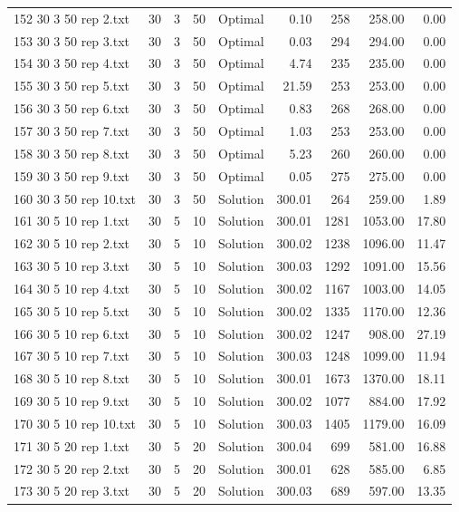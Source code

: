 \begin{longtable}{lrrllrrrr}
152 30 3 50 rep 2.txt & 30 & 3 & 50 & Optimal &  0.10 & 258 & 258.00 &  0.00\\
153 30 3 50 rep 3.txt & 30 & 3 & 50 & Optimal &  0.03 & 294 & 294.00 &  0.00\\
154 30 3 50 rep 4.txt & 30 & 3 & 50 & Optimal &  4.74 & 235 & 235.00 &  0.00\\
155 30 3 50 rep 5.txt & 30 & 3 & 50 & Optimal & 21.59 & 253 & 253.00 &  0.00\\
156 30 3 50 rep 6.txt & 30 & 3 & 50 & Optimal &  0.83 & 268 & 268.00 &  0.00\\
157 30 3 50 rep 7.txt & 30 & 3 & 50 & Optimal &  1.03 & 253 & 253.00 &  0.00\\
158 30 3 50 rep 8.txt & 30 & 3 & 50 & Optimal &  5.23 & 260 & 260.00 &  0.00\\
159 30 3 50 rep 9.txt & 30 & 3 & 50 & Optimal &  0.05 & 275 & 275.00 &  0.00\\
160 30 3 50 rep 10.txt & 30 & 3 & 50 & Solution & 300.01 & 264 & 259.00 &  1.89\\
161 30 5 10 rep 1.txt & 30 & 5 & 10 & Solution & 300.01 & 1281 & 1053.00 & 17.80\\
162 30 5 10 rep 2.txt & 30 & 5 & 10 & Solution & 300.02 & 1238 & 1096.00 & 11.47\\
163 30 5 10 rep 3.txt & 30 & 5 & 10 & Solution & 300.03 & 1292 & 1091.00 & 15.56\\
164 30 5 10 rep 4.txt & 30 & 5 & 10 & Solution & 300.02 & 1167 & 1003.00 & 14.05\\
165 30 5 10 rep 5.txt & 30 & 5 & 10 & Solution & 300.02 & 1335 & 1170.00 & 12.36\\
166 30 5 10 rep 6.txt & 30 & 5 & 10 & Solution & 300.02 & 1247 & 908.00 & 27.19\\
167 30 5 10 rep 7.txt & 30 & 5 & 10 & Solution & 300.03 & 1248 & 1099.00 & 11.94\\
168 30 5 10 rep 8.txt & 30 & 5 & 10 & Solution & 300.01 & 1673 & 1370.00 & 18.11\\
169 30 5 10 rep 9.txt & 30 & 5 & 10 & Solution & 300.02 & 1077 & 884.00 & 17.92\\
170 30 5 10 rep 10.txt & 30 & 5 & 10 & Solution & 300.03 & 1405 & 1179.00 & 16.09\\
171 30 5 20 rep 1.txt & 30 & 5 & 20 & Solution & 300.04 & 699 & 581.00 & 16.88\\
172 30 5 20 rep 2.txt & 30 & 5 & 20 & Solution & 300.01 & 628 & 585.00 &  6.85\\
173 30 5 20 rep 3.txt & 30 & 5 & 20 & Solution & 300.03 & 689 & 597.00 & 13.35\\

\end{longtable}
